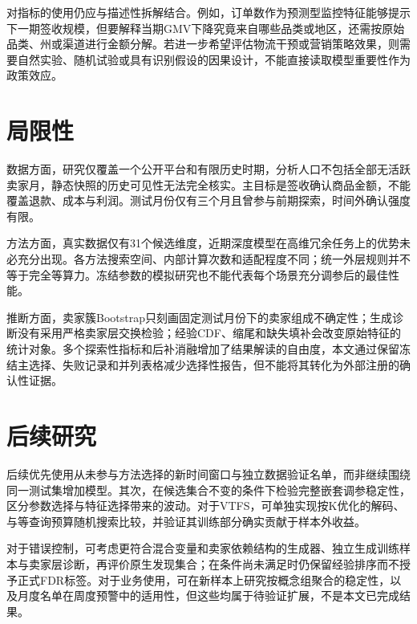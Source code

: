 \documentclass{sufethesismas}
\begin{document}
对指标的使用仍应与描述性拆解结合。例如，订单数作为预测型监控特征能够提示下一期签收规模，但要解释当期GMV下降究竟来自哪些品类或地区，还需按原始品类、州或渠道进行金额分解。若进一步希望评估物流干预或营销策略效果，则需要自然实验、随机试验或具有识别假设的因果设计，不能直接读取模型重要性作为政策效应。

\section{局限性}

数据方面，研究仅覆盖一个公开平台和有限历史时期，分析人口不包括全部无活跃卖家月，静态快照的历史可见性无法完全核实。主目标是签收确认商品金额，不能覆盖退款、成本与利润。测试月份仅有三个月且曾参与前期探索，时间外确认强度有限。

方法方面，真实数据仅有31个候选维度，近期深度模型在高维冗余任务上的优势未必充分出现。各方法搜索空间、内部计算次数和适配程度不同；统一外层规则并不等于完全等算力。冻结参数的模拟研究也不能代表每个场景充分调参后的最佳性能。

推断方面，卖家簇Bootstrap只刻画固定测试月份下的卖家组成不确定性；生成诊断没有采用严格卖家层交换检验；经验CDF、缩尾和缺失填补会改变原始特征的统计对象。多个探索性指标和后补消融增加了结果解读的自由度，本文通过保留冻结主选择、失败记录和并列表格减少选择性报告，但不能将其转化为外部注册的确认性证据。

\section{后续研究}

后续优先使用从未参与方法选择的新时间窗口与独立数据验证名单，而非继续围绕同一测试集增加模型。其次，在候选集合不变的条件下检验完整嵌套调参稳定性，区分参数选择与特征选择带来的波动。对于VTFS，可单独实现按K优化的解码、与等查询预算随机搜索比较，并验证其训练部分确实贡献于样本外收益。

对于错误控制，可考虑更符合混合变量和卖家依赖结构的生成器、独立生成训练样本与卖家层诊断，再评价原生发现集合；在条件尚未满足时仍保留经验排序而不授予正式FDR标签。对于业务使用，可在新样本上研究按概念组聚合的稳定性，以及月度名单在周度预警中的适用性，但这些均属于待验证扩展，不是本文已完成结果。
\end{document}
